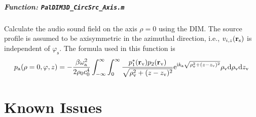 \documentclass[12pt]{article}
\begin{document}
\subparagraph{Function: \lstinline!PalDIM3D_CircSrc_Axis.m!}
Calculate the audio sound field on the axis $\rho=0$ using the DIM.
The source profile is assumed to be axisymmetric in the azimuthal direction, i.e., $v_{i,z}(\vb{r}_\mathrm{s})$ is independent of $\varphi_\mathrm{s}$.
The formula used in this function is
\begin{equation}
    p_\mathrm{a}(\rho = 0, \varphi,z)
    =
    -\frac{\beta\omega_\mathrm{a}^2}{2\rho_0c_0^4}
    \int_{-\infty}^\infty \int_0^\infty
    \frac{p_1^*(\vb{r}_\mathrm{v})p_2(\vb{r}_\mathrm{v})}{\sqrt{\rho_\mathrm{v}^2 + (z-z_\mathrm{v})^2}} \mathrm{e}^{\mathrm{i}k_\mathrm{a} \sqrt{\rho_\mathrm{v}^2 + (z-z_\mathrm{v})^2}}
    \rho_\mathrm{v}\dd \rho_\mathrm{v}\dd z_\mathrm{v}
\end{equation}


\section{Known Issues}



\end{document}
